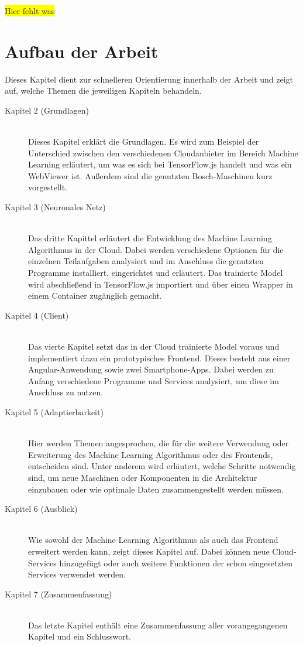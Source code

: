 \colorbox{yellow}{Hier fehlt was}

\newpage

\section{Aufbau der Arbeit}
\label{sec:aufbauDerArbeit}
Dieses Kapitel dient zur schnelleren Orientierung innerhalb der Arbeit und zeigt auf, welche Themen die jeweiligen
Kapiteln behandeln.

\begin{description}

    \item[Kapitel 2 (Grundlagen)]\hfill \\
    Dieses Kapitel erklärt die Grundlagen. Es wird zum Beispiel der Unterschied zwischen den verschiedenen Cloudanbieter
    im Bereich Machine Learning erläutert, um was es sich bei TensorFlow.js handelt und was ein WebViewer ist. Außerdem
    sind die genutzten Bosch-Maschinen kurz vorgestellt.

    \item[Kapitel 3 (Neuronales Netz)]\hfill \\
    Das dritte Kapittel erläutert die Entwicklung des Machine Learning Algorithmus in der Cloud. Dabei werden verschiedene
    Optionen für die einzelnen Teilaufgaben analysiert und im Anschluss die genutzten Programme installiert, eingerichtet
    und erläutert. Das trainierte Model wird abschließend in TensorFlow.js importiert und über einen Wrapper in einem
    Container zugänglich gemacht.

    \item[Kapitel 4 (Client)]\hfill \\
    Das vierte Kapitel setzt das in der Cloud trainierte Model voraus und implementiert dazu ein prototypisches Frontend.
    Dieses besteht aus einer Angular-Anwendung sowie zwei Smartphone-Apps. Dabei werden zu Anfang verschiedene Programme
    und Services analysiert, um diese im Anschluss zu nutzen.

    \item[Kapitel 5 (Adaptierbarkeit)]\hfill \\
    Hier werden Themen angesprochen, die für die weitere Verwendung oder Erweiterung des Machine Learning Algorithmus
    oder des Frontends, entscheiden sind. Unter anderem wird erläutert, welche Schritte notwendig sind, um neue Maschinen
    oder Komponenten in die Architektur einzubauen oder wie optimale Daten zusammengestellt werden müssen.

    \item[Kapitel 6 (Ausblick)]\hfill \\
    Wie sowohl der Machine Learning Algorithmus als auch das Frontend erweitert werden kann, zeigt dieses Kapitel auf.
    Dabei können neue Cloud-Services hinzugefügt oder auch weitere Funktionen der schon eingesetzten Services verwendet
    werden.

    \item[Kapitel 7 (Zusammenfassung)]\hfill \\
    Das letzte Kapitel enthält eine Zusammenfassung aller vorangegangenen Kapitel und ein Schlusswort.

\end{description}
